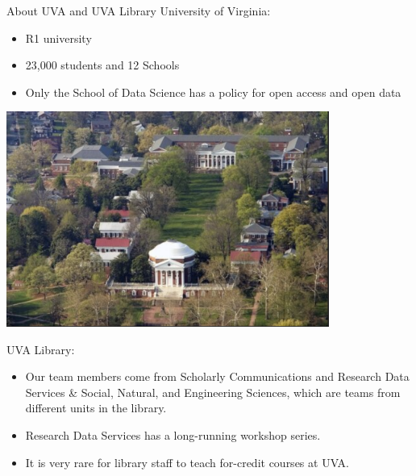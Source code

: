 \documentclass[
  ignorenonframetext,
]{beamer}
\providecommand{\tightlist}{%
  \setlength{\itemsep}{0pt}\setlength{\parskip}{0pt}}
\begin{document}
\begin{frame}{About UVA and UVA Library}
\protect\hypertarget{about-uva-and-uva-library}{}
University of Virginia:

\begin{itemize}
\tightlist
\item
  R1 university
\item
  23,000 students and 12 Schools
\item
  Only the School of Data Science has a policy for open access and open
  data
\end{itemize}

\includegraphics[width=4.16667in,height=\textheight]{images/UVA.png}

UVA Library:

\begin{itemize}
\tightlist
\item
  Our team members come from Scholarly Communications and Research Data
  Services \& Social, Natural, and Engineering Sciences, which are teams
  from different units in the library.
\item
  Research Data Services has a long-running workshop series.
\item
  It is very rare for library staff to teach for-credit courses at UVA.
\end{itemize}

\end{frame}
\end{document}
